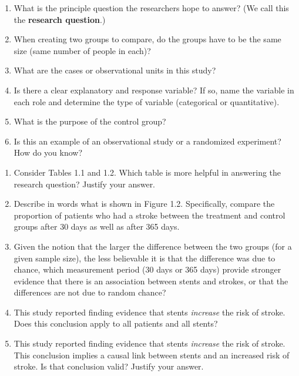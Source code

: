 \documentclass[
]{report}
\newcommand{\rgs}{\vspace{12pt}} %
\begin{document}
\begin{enumerate}
\def\labelenumi{\arabic{enumi}.}
\item
  What is the principle question the researchers hope to answer? (We call this the \textbf{research question}.)
  \rgs
  \rgs
\item
  When creating two groups to compare, do the groups have to be the same size (same number of people in each)?
  \rgs
  \rgs
\item
  What are the cases or observational units in this study?
  \rgs
  \rgs
\item
  Is there a clear explanatory and response variable? If so, name the variable in each role and determine the type of variable (categorical or quantitative).
  \rgs
  \rgs
\item
  What is the purpose of the control group?
  \rgs
  \rgs
\item
  Is this an example of an observational study or a randomized experiment? How do you know?
  \rgs
  \rgs
\end{enumerate}

\newpage

\begin{enumerate}
\def\labelenumi{\arabic{enumi}.}
\setcounter{enumi}{6}
\item
  Consider Tables 1.1 and 1.2. Which table is more helpful in answering the research question? Justify your answer.
  \rgs
  \rgs
\item
  Describe in words what is shown in Figure 1.2. Specifically, compare the proportion of patients who had a stroke between the treatment and control groups after 30 days as well as after 365 days.
  \rgs
  \rgs
\item
  Given the notion that the larger the difference between the two groups (for a given sample size), the less believable it is that the difference was due to chance, which measurement period (30 days or 365 days) provide stronger evidence that there is an association between stents and strokes, or that the differences are not due to random chance?
  \rgs
  \rgs
\item
  This study reported finding evidence that stents \emph{increase} the risk of stroke. Does this conclusion apply to all patients and all stents?
  \rgs
  \rgs
\item
  This study reported finding evidence that stents \emph{increase} the risk of stroke. This conclusion implies a causal link between stents and an increased risk of stroke. Is that conclusion valid? Justify your answer.
  \rgs
  \rgs
\end{enumerate}
\end{document}

